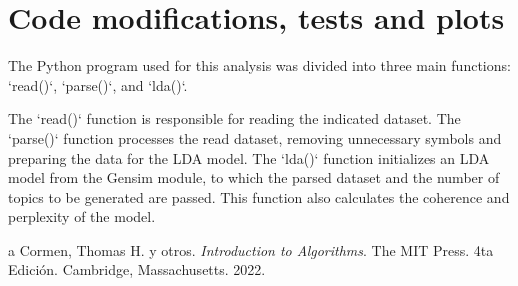 \documentclass[10pt]{article} %
\begin{document}
	\section{Code modifications, tests and plots}
	
	The Python program used for this analysis was divided into three main functions: `read()`, `parse()`, and `lda()`.
	
	The `read()` function is responsible for reading the indicated dataset. The `parse()` function processes the read dataset, removing unnecessary symbols and preparing the data for the LDA model. The `lda()` function initializes an LDA model from the Gensim module, to which the parsed dataset and the number of topics to be generated are passed. This function also calculates the coherence and perplexity of the model.
	
	
	\begin{thebibliography}
		a
		 Cormen, Thomas H. y otros. \emph{Introduction to Algorithms}. 
		The MIT Press.
		4ta Edici\'on.		
		Cambridge, Massachusetts.
		2022.
	\end{thebibliography}
\end{document}
